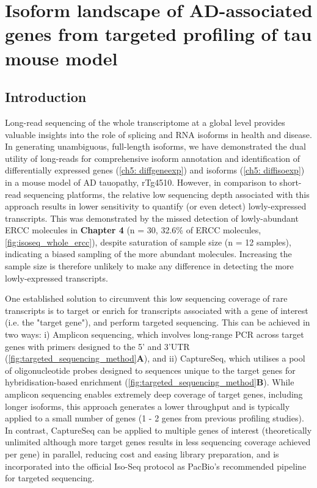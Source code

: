 \chapter{Isoform landscape of AD-associated genes from targeted profiling of tau mouse model}\label{ch: targeted_transcriptome}
\label{targetedmousetranscriptome}


\section{Introduction}
Long-read sequencing of the whole transcriptome at a global level provides valuable insights into the role of splicing and RNA isoforms in health and disease\cite{DePaoli-Iseppi2021}. In generating unambiguous, full-length isoforms, we have demonstrated the dual utility of long-reads for comprehensive isoform annotation and identification of differentially expressed genes (\cref{ch5: diffgeneexp}) and isoforms (\cref{ch5: diffisoexp}) in a mouse model of AD tauopathy, rTg4510. However, in comparison to short-read sequencing platforms, the relative low sequencing depth associated with this approach results in lower sensitivity to quantify (or even detect) lowly-expressed transcripts\cite{Stark2019}. This was demonstrated by the missed detection of lowly-abundant ERCC molecules in \textbf{Chapter 4} (n = 30, 32.6\% of ERCC molecules, \cref{fig:isoseq_whole_ercc}), despite saturation of sample size (n = 12 samples), indicating a biased sampling of the more abundant molecules. Increasing the sample size is therefore unlikely to make any difference in detecting the more lowly-expressed transcripts. 

One established solution to circumvent this low sequencing coverage of rare transcripts is to target or enrich for transcripts associated with a gene of interest (i.e. the "target gene"), and perform targeted sequencing\cite{Sheynkman2020}. This can be achieved in two ways\cite{DePaoli-Iseppi2021}: i) Amplicon sequencing, which involves long-range PCR across target genes with primers designed to the 5' and 3'UTR (\cref{fig:targeted_sequencing_method}\textbf{A}), and ii) CaptureSeq, which utilises a pool of oligonucleotide probes designed to sequences unique to the target genes for hybridisation-based enrichment (\cref{fig:targeted_sequencing_method}\textbf{B}). While amplicon sequencing enables extremely deep coverage of target genes, including longer isoforms, this approach generates a lower throughput and is typically applied to a small number of genes (1 - 2 genes from previous profiling studies). In contrast, CaptureSeq can be applied to multiple genes of interest (theoretically unlimited although more target genes results in less sequencing coverage achieved per gene) in parallel, reducing cost and easing library preparation, and is incorporated into the official Iso-Seq protocol as PacBio's recommended pipeline for targeted sequencing\cite{Tseng2019}.  


